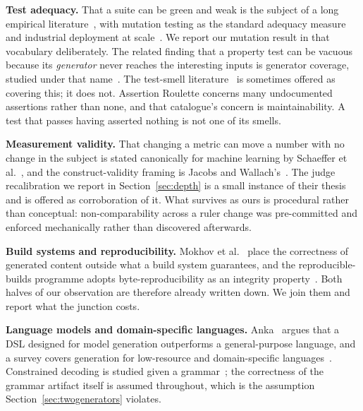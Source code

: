 \documentclass[10pt,journal,compsoc]{IEEEtran}
\begin{document}
\textbf{Test adequacy.} That a suite can be green and weak is the subject of a long empirical
literature~\cite{inozemtseva2014coverage,zhang2015assertions}, with mutation testing as the
standard adequacy measure~\cite{demillo1978hints,jia2011mutationsurvey,papadakis2019mutationadvances}
and industrial deployment at scale~\cite{petrovic2018googlemutation}. We report our mutation
result in that vocabulary deliberately. The related finding that a property test can be vacuous
because its \emph{generator} never reaches the interesting inputs is generator coverage, studied
under that name~\cite{groce2012swarm,goldstein2021judgecover}. The test-smell
literature~\cite{vandeursen2001refactoringtest,bavota2012testsmells} is sometimes offered as
covering this; it does not. Assertion Roulette concerns many undocumented assertions rather
than none, and that catalogue's concern is maintainability. A test that passes having asserted
nothing is not one of its smells.

\textbf{Measurement validity.} That changing a metric can move a number with no change in the
subject is stated canonically for machine learning by Schaeffer et
al.~\cite{schaeffer2023mirage}, and the construct-validity framing is Jacobs and
Wallach's~\cite{jacobs2021measurement}. The judge recalibration we report in
Section~\ref{sec:depth} is a small instance of their thesis and is offered as corroboration of
it. What survives as ours is procedural rather than conceptual: non-comparability across a
ruler change was pre-committed and enforced mechanically rather than discovered afterwards.

\textbf{Build systems and reproducibility.} Mokhov et al.~\cite{mokhov2020buildsystems} place
the correctness of generated content outside what a build system guarantees, and the
reproducible-builds programme adopts byte-reproducibility as an integrity
property~\cite{lamb2022reproducible}. Both halves of our observation are therefore already
written down. We join them and report what the junction costs.

\textbf{Language models and domain-specific languages.} Anka~\cite{almazrouei2025anka} argues
that a DSL designed for model generation outperforms a general-purpose language, and a survey
covers generation for low-resource and domain-specific
languages~\cite{joel2024dslsurvey}. Constrained decoding is studied given a
grammar~\cite{park2024gad,wang2023grammarprompting,geng2025jsonschemabench}; the correctness of
the grammar artifact itself is assumed throughout, which is the assumption
Section~\ref{sec:twogenerators} violates.
\end{document}

